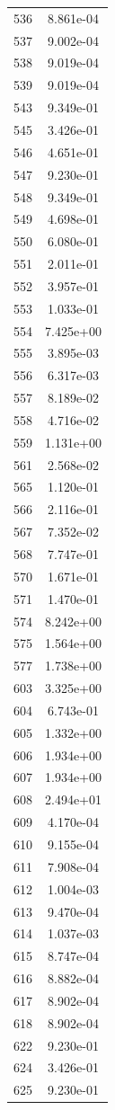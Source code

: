 \documentclass[12pt]{article}
\begin{document}
\begin{longtable}{@{}cc@{}}
536 & 8.861e-04 \\
537 & 9.002e-04 \\
538 & 9.019e-04 \\
539 & 9.019e-04 \\
543 & 9.349e-01 \\
545 & 3.426e-01 \\
546 & 4.651e-01 \\
547 & 9.230e-01 \\
548 & 9.349e-01 \\
549 & 4.698e-01 \\
550 & 6.080e-01 \\
551 & 2.011e-01 \\
552 & 3.957e-01 \\
553 & 1.033e-01 \\
554 & 7.425e+00 \\
555 & 3.895e-03 \\
556 & 6.317e-03 \\
557 & 8.189e-02 \\
558 & 4.716e-02 \\
559 & 1.131e+00 \\
561 & 2.568e-02 \\
565 & 1.120e-01 \\
566 & 2.116e-01 \\
567 & 7.352e-02 \\
568 & 7.747e-01 \\
570 & 1.671e-01 \\
571 & 1.470e-01 \\
574 & 8.242e+00 \\
575 & 1.564e+00 \\
577 & 1.738e+00 \\
603 & 3.325e+00 \\
604 & 6.743e-01 \\
605 & 1.332e+00 \\
606 & 1.934e+00 \\
607 & 1.934e+00 \\
608 & 2.494e+01 \\
609 & 4.170e-04 \\
610 & 9.155e-04 \\
611 & 7.908e-04 \\
612 & 1.004e-03 \\
613 & 9.470e-04 \\
614 & 1.037e-03 \\
615 & 8.747e-04 \\
616 & 8.882e-04 \\
617 & 8.902e-04 \\
618 & 8.902e-04 \\
622 & 9.230e-01 \\
624 & 3.426e-01 \\
625 & 9.230e-01 \\

\bottomrule
\end{longtable}
\end{document}

